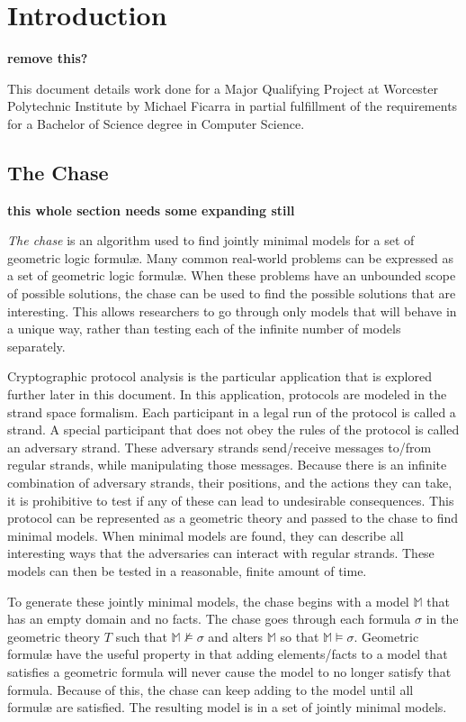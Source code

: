 \section{Introduction}

	\textbf{ remove this? }

	This document details work done for a Major Qualifying Project at Worcester
	Polytechnic Institute by Michael Ficarra in partial fulfillment of the
	requirements for a Bachelor of Science degree in Computer Science.

	\subsection{The Chase}

		\textbf{ this whole section needs some expanding still }

		\emph{The chase} is an algorithm used to find jointly minimal models
		for a set of geometric logic formul{\ae}. Many common real-world
		problems can be expressed as a set of geometric logic formul{\ae}. When
		these problems have an unbounded scope of possible solutions, the chase
		can be used to find the possible solutions that are interesting. This
		allows researchers to go through only models that will behave in a
		unique way, rather than testing each of the infinite number of models
		separately.

		Cryptographic protocol analysis is the particular application that is
		explored further later in this document. In this application, protocols
		are modeled in the strand space formalism. Each participant in a legal
		run of the protocol is called a strand. A special participant that does
		not obey the rules of the protocol is called an adversary strand. These
		adversary strands send/receive messages to/from regular strands, while
		manipulating those messages. Because there is an infinite combination
		of adversary strands, their positions, and the actions they can take,
		it is prohibitive to test if any of these can lead to undesirable
		consequences. This protocol can be represented as a geometric theory
		and passed to the chase to find minimal models. When minimal models are
		found, they can describe all interesting ways that the adversaries can
		interact with regular strands. These models can then be tested in a
		reasonable, finite amount of time.

		To generate these jointly minimal models, the chase begins with a model
		$\mathbb{M}$ that has an empty domain and no facts. The chase goes
		through each formula $\sigma$ in the geometric theory $T$ such that
		$\mathbb{M} \not\models \sigma$ and alters $\mathbb{M}$ so that
		$\mathbb{M} \models \sigma$. Geometric formul{\ae} have the useful
		property in that adding elements/facts to a model that satisfies a
		geometric formula will never cause the model to no longer satisfy that
		formula.  Because of this, the chase can keep adding to the model until
		all formul{\ae} are satisfied. The resulting model is in a set of
		jointly minimal models.

